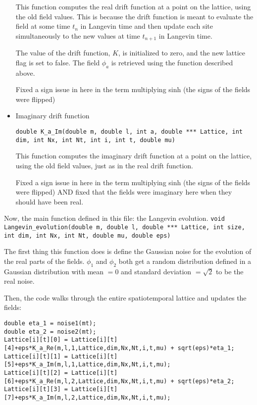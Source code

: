 \documentclass[../../RotatingBosons.tex]{subfiles}
\begin{document}
\begin{itemize}
	This function computes the real drift function at a point on the lattice, using the old field values. This is because the drift function is meant to evaluate the field at some time $t_{n}$ in Langevin time and then update each site simultaneously to the new values at time $t_{n+1}$ in Langevin time.
	
	The value of the drift function, $K$, is initialized to zero, and the new lattice flag is set to false. The field $\phi_a$ is retrieved using the function described above. 
	
	Fixed a sign issue in here in the term multiplying sinh (the signs of the fields were flipped)
	
	\item Imaginary drift function
	
	\lstinline{double K_a_Im(double m, double l, int a, double *** Lattice, int dim, int Nx, int Nt, int i, int t, double mu)}
	
	This function computes the imaginary drift function at a point on the lattice, using the old field values, just as in the real drift function.
	
	Fixed a sign issue in here in the term multiplying sinh (the signs of the fields were flipped) AND fixed that the fields were imaginary here when they should have been real.
	
\end{itemize}

Now, the main function defined in this file: the Langevin evolution.
\lstinline{void Langevin_evolution(double m, double l, double *** Lattice, int size, int dim, int Nx, int Nt, double mu, double eps)}

The first thing this function does is define the Gaussian noise for the evolution of the real parts of the fields. $\phi_{1}$ and $\phi_{2}$ both get a random distribution defined in a Gaussian distribution with mean $=0$ and standard deviation $= \sqrt{2}$ to be the real noise.

Then, the code walks through the entire spatiotemporal lattice and updates the fields:
\begin{lstlisting}
double eta_1 = noise1(mt);
double eta_2 = noise2(mt);
Lattice[i][t][0] = Lattice[i][t][4]+eps*K_a_Re(m,l,1,Lattice,dim,Nx,Nt,i,t,mu) + sqrt(eps)*eta_1;
Lattice[i][t][1] = Lattice[i][t][5]+eps*K_a_Im(m,l,1,Lattice,dim,Nx,Nt,i,t,mu);
Lattice[i][t][2] = Lattice[i][t][6]+eps*K_a_Re(m,l,2,Lattice,dim,Nx,Nt,i,t,mu) + sqrt(eps)*eta_2;
Lattice[i][t][3] = Lattice[i][t][7]+eps*K_a_Im(m,l,2,Lattice,dim,Nx,Nt,i,t,mu);
\end{lstlisting}
\end{document}
